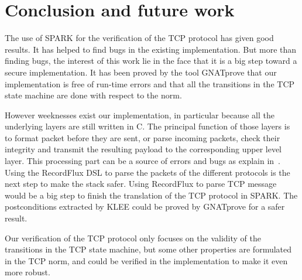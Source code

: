 \documentclass[runningheads]{llncs}
\begin{document}
\section{Conclusion and future work}

    The use of SPARK for the verification of the TCP protocol has given good results. It has helped to find bugs
    in the existing implementation. But more than finding bugs, the interest of this work lie in the face that it is
    a big step toward a secure implementation. It has been proved by the tool GNATprove that our implementation is free
    of run-time errors and that all the transitions in the TCP state machine are done with respect to the norm.

    However weeknesses exist our implementation, in particular because all the underlying layers are still written in C.
    The principal function of those layers is to format packet before they are sent, or parse incoming packets, check
    their integrity and transmit the resulting payload to the corresponding upper level layer.
    This processing part can be a source of errors and bugs as explain in~\cite{Reiher2019RecordFluxFM}.
    Using the RecordFlux DSL to parse the packets of the different protocols is the next step to make the stack safer.
    Using RecordFlux to parse TCP message would be a big step to finish the translation of the TCP protocol in SPARK.
    The postconditions extracted by KLEE could be proved by GNATprove for a safer result.

    Our verification of the TCP protocol only focuses on the validity of the transitions in the TCP state machine,
    but some other properties are formulated in the TCP norm, and could be verified in the implementation to make
    it even more robust.






\end{document}
